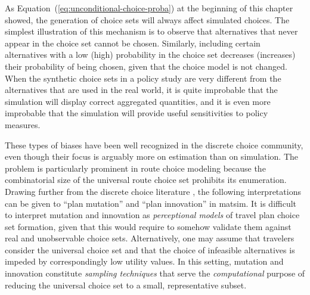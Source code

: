 % 
%

As Equation~(\ref{eq:unconditional-choice-proba}) at the beginning of this chapter showed, the generation of choice sets will always affect simulated choices.
%
The simplest illustration of this mechanism is to observe that alternatives that never appear in the choice set cannot be chosen. Similarly, including certain alternatives with a low (high) probability in the choice set decreases (increases) their probability of being chosen, given that the choice model is not changed. When the synthetic choice sets in a policy study are very different from the alternatives that are used in the real world, it is quite improbable that the simulation will display correct aggregated quantities, and it is even more improbable that the simulation will provide useful sensitivities to policy measures.

These types of biases have been well recognized in the discrete choice community,
even though their focus is arguably more on estimation than on simulation.
The problem is particularly prominent in route choice modeling because the combinatorial
size of the universal route choice set prohibits its enumeration.
Drawing further from the discrete choice literature \citep[specifically][]{frejinger-2010}, 
the following interpretations can be given to ``plan mutation'' and ``plan innovation'' in \gls{matsim}. 
%
%
It is difficult to interpret mutation and innovation as \emph{perceptional models} of travel plan choice set formation,
given that this would require to somehow validate them against real and unobservable choice sets.
Alternatively, one may assume that travelers consider the universal choice set and that the choice of infeasible 
alternatives is impeded by correspondingly low utility values. In this setting, mutation and innovation
constitute \emph{sampling techniques} that serve the \emph{computational} purpose of reducing the universal choice
set to a small, representative subset.

